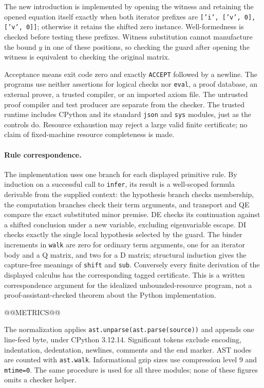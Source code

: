 \documentclass[11pt]{article}
\theoremstyle{definition}
\theoremstyle{remark}
\begin{document}
The new introduction is implemented by opening the witness and retaining
the opened equation itself exactly when both iterator prefixes are
\texttt{['i', ['v', 0], ['v', 0]]}; otherwise it retains the shifted
zero instance. Well-formedness is checked before testing these prefixes.
Witness substitution cannot manufacture the bound \(y\) in one of these
positions, so checking the guard after opening the witness is equivalent
to checking the original matrix.

Acceptance means exit code zero and exactly \texttt{ACCEPT} followed by a
newline. The programs use neither assertions for logical checks nor
\texttt{eval}, a proof database, an external prover, a trusted compiler,
or an imported axiom file. The untrusted proof compiler and test producer
are separate from the checker. The trusted runtime includes CPython and
its standard \texttt{json} and \texttt{sys} modules, just as the controls
do. Resource exhaustion may reject a large valid finite certificate;
no claim of fixed-machine resource completeness is made.

\paragraph{Rule correspondence.}
The implementation uses one branch for each displayed primitive rule.
By induction on a successful call to \texttt{infer}, its result is a
well-scoped formula derivable from the supplied context: the hypothesis
branch checks membership, the computation branches check their term
arguments, and transport and QE compare the exact substituted minor
premise. DE checks its continuation against a shifted conclusion under a
new variable, excluding eigenvariable escape. DI checks exactly the
single local hypothesis selected by the guard. The binder increments in
\texttt{walk} are zero for ordinary term arguments, one for an iterator
body and a Q matrix, and two for a D matrix; structural induction gives
the capture-free meanings of \texttt{shift} and \texttt{sub}.
Conversely every finite derivation of the displayed calculus has the
corresponding tagged certificate. This is a written correspondence
argument for the idealized unbounded-resource program, not a
proof-assistant-checked theorem about the Python implementation.

@@METRICS@@

The normalization applies \texttt{ast.unparse(ast.parse(source))} and
appends one line-feed byte, under CPython 3.12.14. Significant tokens exclude encoding, indentation,
dedentation, newlines, comments and the end marker. AST nodes are counted
with \texttt{ast.walk}. Informational gzip sizes use compression level 9
and \texttt{mtime=0}. The same procedure is used for all three modules;
none of these figures omits a checker helper.
\end{document}
